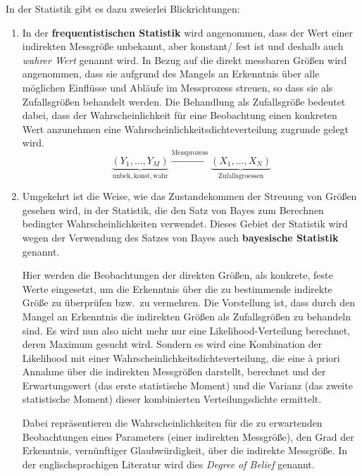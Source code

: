 In der Statistik gibt es dazu zweierlei Blickrichtungen:
\begin{enumerate}
\item In der \textbf{frequentistischen Statistik} wird angenommen,
dass der Wert einer indirekten Messgröße unbekannt, aber konstant/ fest ist und deshalb
auch \textsl{wahrer Wert} genannt wird. In Bezug auf die direkt messbaren Größen wird angenommen,
dass sie aufgrund des Mangels an Erkenntnis über alle möglichen Einflüsse und Abläufe im Messprozess
streuen, so dass sie als Zufallsgrößen behandelt werden. Die Behandlung als Zufallsgröße
bedeutet dabei, dass der Wahrscheinlichkeit für eine Beobachtung einen konkreten Wert anzunehmen eine
Wahrscheinlichkeitsdichteverteilung zugrunde gelegt wird.
\begin{equation}
\underbrace{(Y_1, \dots, Y_M)}_{\mathrm{unbek, konst, wahr}} \xrightarrow{\mathrm{Messprozess}}
\underbrace{(X_1, \dots, X_N)}_{\mathrm{Zufallsgroessen}}
\end{equation}
\item Umgekehrt ist die Weise, wie das Zustandekommen der Streuung von Größen gesehen wird,
in der Statistik, die den Satz von Bayes zum Berechnen bedingter Wahrscheinlichkeiten 
verwendet. Dieses Gebiet der Statistik wird wegen der Verwendung des
Satzes von Bayes auch \textbf{bayesische Statistik} genannt.

Hier werden die Beobachtungen der direkten Größen, als konkrete, feste Werte eingesetzt,
um die Erkenntnis über die zu bestimmende indirekte Größe zu überprüfen bzw.\ zu vermehren.
Die Vorstellung ist, dass durch den Mangel an Erkenntnis die indirekten Größen als
Zufallsgrößen zu behandeln sind. Es wird nun also nicht mehr nur eine Likelihood-Verteilung
berechnet, deren Maximum gesucht wird. Sondern es wird eine Kombination der Likelihood mit
einer Wahrscheinlichkeitsdichteverteilung,
die eine {\`a} priori Annahme über die indirekten Messgrößen darstellt, berechnet und der
Erwartungswert (das erste statistische Moment) und die Varianz (das zweite statistische Moment)
dieser kombinierten Verteilungsdichte ermittelt.

Dabei repräsentieren die Wahrscheinlichkeiten für die zu erwartenden Beobachtungen eines Parameters
(einer indirekten Messgröße), 
den Grad der Erkenntnis, vernünftiger Glaubwürdigkeit, über die indirekte Messgröße.
In der englischsprachigen Literatur wird dies \textsl{Degree of Belief} genannt.


\end{enumerate}
